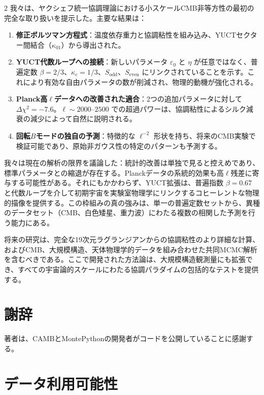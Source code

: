 \documentclass[11pt,a4paper]{article}
\begin{document}
\begin{multicols}{2}
		我々は、ヤクシェフ統一協調理論における小スケールCMB非等方性の最初の完全な取り扱いを提示した。主要な結果は：
		\begin{enumerate}
			\item \textbf{修正ボルツマン方程式}：温度依存重力と協調粘性を組み込み、YUCTセクター間結合（\(\kappa_{01}\)）から導出された。
			\item \textbf{YUCT代数ループへの接続}：新しいパラメータ \(\varepsilon_0\) と \(\eta\) が任意ではなく、普遍定数 \(\beta=2/3\)、\(\kappa_c=1/3\)、\(S_{\mathrm{odd}}\)、\(S_{\mathrm{even}}\) にリンクされていることを示す。これにより有効な自由パラメータの数が削減され、物理的動機が強化される。
			\item \textbf{Planck高\(\ell\)データへの改善された適合}：2つの追加パラメータに対して \(\Delta\chi^2 = -7.6\)。\(\ell \sim 2000\)--\(2500\) での超過パワーは、協調粘性によるシルク減衰の減少によって自然に説明される。
			\item \textbf{回転\(B\)モードの独自の予測}：特徴的な \(\ell^{-2}\) 形状を持ち、将来のCMB実験で検証可能であり、原始非ガウス性の特定のパターンも予測する。
		\end{enumerate}
		
		我々は現在の解析の限界を議論した：統計的改善は単独で見ると控えめであり、標準パラメータとの縮退が存在する。Planckデータの系統的効果も高\(\ell\)残差に寄与する可能性がある。それにもかかわらず、YUCT拡張は、普遍指数 \(\beta = 0.67\) と代数ループを介して初期宇宙を実験室物理学にリンクするコヒーレントな物理的描像を提供する。この枠組みの真の強みは、単一の普遍定数セットから、異種のデータセット（CMB、白色矮星、重力波）にわたる複数の相関した予測を行う能力にある。
		
		将来の研究は、完全な19次元ラグランジアンからの協調粘性のより詳細な計算、およびCMB、大規模構造、天体物理学的データを組み合わせた共同MCMC解析を含むべきである。ここで開発された方法論は、大規模構造観測量にも拡張でき、すべての宇宙論的スケールにわたる協調パラダイムの包括的なテストを提供する。
		
		\section*{謝辞}
		
		著者は、CAMBとMontePythonの開発者がコードを公開していることに感謝する。
		
		\section*{データ利用可能性}
		

\end{multicols}
\end{document}
